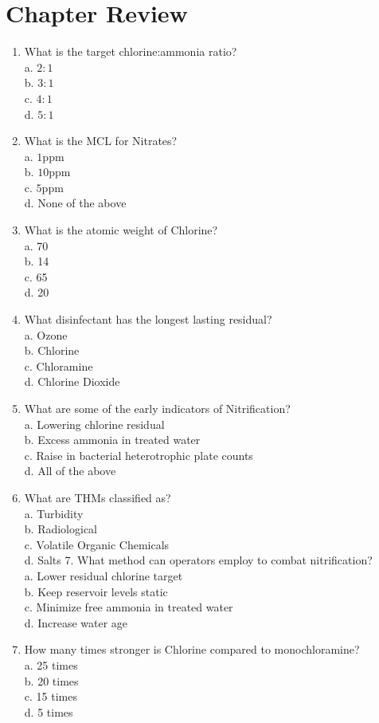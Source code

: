 \documentclass[10pt]{article}
\begin{document}
\section{Chapter Review}
\begin{enumerate}
  \item What is the target chlorine:ammonia ratio?\\
a. $2: 1$\\
b. $3: 1$\\
c. $4: 1$\\
d. $5: 1$

  \item What is the MCL for Nitrates?\\
a. $1 \mathrm{ppm}$\\
b. $10 \mathrm{ppm}$\\
c. $5 \mathrm{ppm}$\\
d. None of the above

  \item What is the atomic weight of Chlorine?\\
a. 70\\
b. 14\\
c. 65\\
d. 20

  \item What disinfectant has the longest lasting residual?\\
a. Ozone\\
b. Chlorine\\
c. Chloramine\\
d. Chlorine Dioxide

  \item What are some of the early indicators of Nitrification?\\
a. Lowering chlorine residual\\
b. Excess ammonia in treated water\\
c. Raise in bacterial heterotrophic plate counts\\
d. All of the above

  \item What are THMs classified as?\\
a. Turbidity\\
b. Radiological\\
c. Volatile Organic Chemicals\\
d. Salts 7. What method can operators employ to combat nitrification?\\
a. Lower residual chlorine target\\
b. Keep reservoir levels static\\
c. Minimize free ammonia in treated water\\
d. Increase water age

  \item How many times stronger is Chlorine compared to monochloramine?\\
a. 25 times\\
b. 20 times\\
c. 15 times\\
d. 5 times

\end{enumerate}
\end{document}
